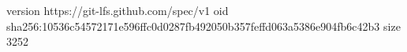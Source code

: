 version https://git-lfs.github.com/spec/v1
oid sha256:10536c54572171e596ffc0d0287fb492050b357feffd063a5386e904fb6c42b3
size 3252
